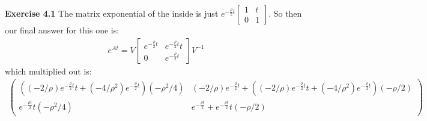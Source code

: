 \documentclass[12pt]{article}
\newenvironment{exercise}[1]{\vspace{.1in}\noindent\textbf{Exercise #1 \hspace{.05em}}}{}
\theoremstyle{definition}
\theoremstyle{remark}
\begin{document}
\begin{exercise}{4.1}
	The matrix exponential of the inside is just $e^{-\frac{\rho}{2}t}%
		\begin{bmatrix}
			1 & t \\
			0 & 1
		\end{bmatrix}$. So then our final answer for this one is:
	\begin{align}
		e^{At}=V %
		\begin{bmatrix}
			e^{-\frac{\rho}{2} t} & e^{-\frac{\rho}{2} t} t \\
			0                     & e^{-\frac{\rho}{2} t}
		\end{bmatrix}V^{-1}
	\end{align}
	which multiplied out is:
	\begin{align}
		\begin{pmatrix}\left(\left(-2/\rho\right)e^{-\frac{\rho}{2}t}t+\left(-4/\rho^2\right)e^{-\frac{\rho}{2}t}\right)\left(-\rho^2/4\right) & \left(-2/\rho\right)e^{-\frac{\rho}{2}t}+\left(\left(-2/\rho\right)e^{-\frac{\rho}{2}t}t+\left(-4/\rho^2\right)e^{-\frac{\rho}{2}t}\right)\left(-\rho/2\right) \\
               e^{-\frac{\rho t}{2}}t\left(-\rho^2/4\right)                                                                            & e^{-\frac{\rho t}{2}}+e^{-\frac{\rho t}{2}}t\left(-\rho/2\right)\end{pmatrix}
	\end{align}
\end{exercise}
\end{document}
